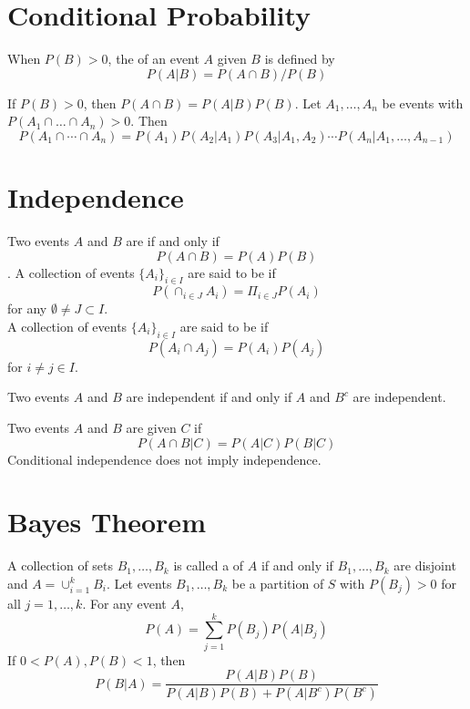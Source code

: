 \documentclass[11pt]{article}
\begin{document}
\section{Conditional Probability}
When $P(B) > 0$, the  of an event $A$ given $B$ is defined by $$P(A|B) = P(A\cap B) / P(B)$$

\theorem
If $P(B) > 0$, then $P(A \cap B) = P(A|B)P(B)$.
\theorem
Let $A_1, \hdots, A_n$ be events with $P(A_1 \cap \hdots \cap A_n) > 0$. Then
\begin{equation}
P\left(A_{1} \cap \cdots \cap A_{n}\right)=P\left(A_{1}\right) P\left(A_{2} | A_{1}\right) P\left(A_{3} | A_{1}, A_{2}\right) \cdots P\left(A_{n} | A_{1}, \ldots, A_{n-1}\right)
\end{equation}

\section{Independence}
Two events $A$ and $B$ are  if and only if 
$$P(A\cap B) = P(A)P(B)$$.
A collection of events $\{A_i\}_{i\in I}$ are said to be  if
$$P(\cap_{i\in J} A_i) = \Pi_{i\in J} P(A_i)$$
for any $\emptyset \neq J \subset I$. \\
A collection of events $\{A_i\}_{i\in I}$ are said to be  if
$$P(A_i \cap A_j) = P(A_i)P(A_j)$$
for $i \neq j \in I$.

\theorem Two events $A$ and $B$ are independent if and only if $A$ and $B^c$ are independent.

Two events $A$ and $B$ are  given $C$ if
$$P(A\cap B | C) = P(A|C)P(B|C)$$
\remark Conditional independence does not imply independence.

\section{Bayes Theorem}
A collection of sets $B_1, \hdots, B_k$ is called a  of $A$ if and only if $B_1, \hdots, B_k$ are disjoint and $A = \cup_{i=1}^k B_i$.
Let events $B_1, \hdots, B_k$ be a partition of $S$ with $P(B_j) > 0$ for all $j = 1,\hdots, k$. For any event $A$,
$$P(A) = \sum_{j=1}^k P(B_j)P(A|B_j)$$
If $ 0 < P(A), P(B) < 1$, then
$$P(B|A) = \frac{P(A|B)P(B)}{P(A|B)P(B) + P(A|B^c)P(B^c)}$$
\end{document}
